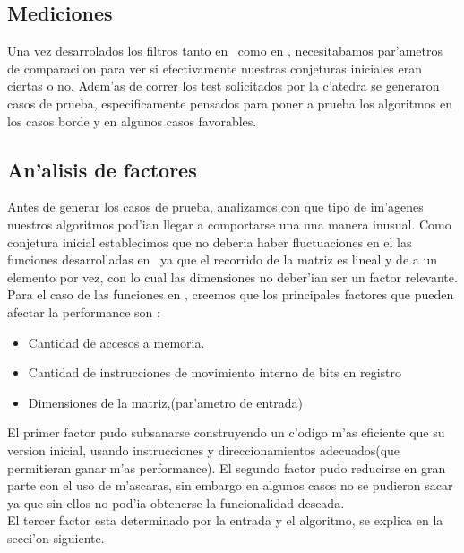 
\subsection{Mediciones}
Una vez desarrolados los filtros tanto en \C \  como en \ass, necesitabamos par'ametros de comparaci'on
para ver si efectivamente nuestras conjeturas iniciales eran ciertas o no.
Adem'as de correr los test solicitados por la c'atedra se generaron casos de prueba,
especificamente pensados para poner a prueba los algoritmos en los casos borde y en algunos casos
favorables.\\
\subsection{An'alisis de factores}
Antes de generar los casos de prueba, analizamos con que tipo de im'agenes nuestros algoritmos pod'ian
llegar a comportarse una una manera inusual. Como conjetura inicial establecimos que no deberia haber 
fluctuaciones en el las funciones desarrolladas en \C \ ya que el recorrido de la matriz es lineal y
de a un elemento por vez, con lo cual las dimensiones no deber'ian ser un factor relevante. \\
Para el caso de las funciones en \ass, creemos que los principales factores que pueden afectar la 
performance son : \\
\begin{itemize}
 \item{Cantidad de accesos a memoria}.
 \item{Cantidad de instrucciones de movimiento interno de bits en registro}
 \item{Dimensiones de la matriz,(par'ametro de entrada)}
\end{itemize}
El primer factor pudo subsanarse construyendo un c'odigo m'as eficiente que su version inicial, 
usando instrucciones y direccionamientos adecuados(que permitieran ganar m'as performance).
El segundo factor pudo reducirse en gran parte con el uso de m'ascaras, sin embargo en algunos casos
no se pudieron sacar ya que sin ellos no pod'ia obtenerse la funcionalidad deseada.\\
El tercer factor esta determinado por la entrada y el algoritmo, se explica en la secci'on siguiente.
